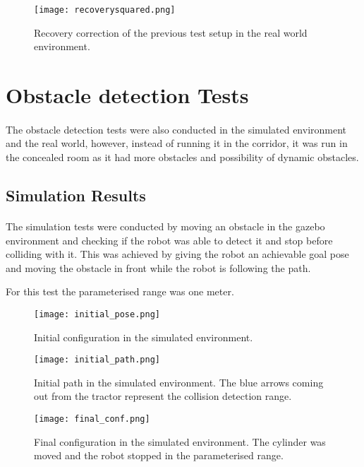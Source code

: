 \begin{figure}[h]
    \centering
    \texttt{[image: recoverysquared.png]}
    \caption{Recovery correction of the previous test setup in the real world environment.}
    \label{fig:real_recovery_test4}
\end{figure}


\clearpage
\section{Obstacle detection Tests}
\label{sec:obstacle_detection_tests}
\paragraph{}The obstacle detection tests were also conducted in the simulated environment 
and the real world, however, instead of running it in the corridor, it was run 
in the concealed room as it had more obstacles and possibility of dynamic obstacles.

\subsection{Simulation Results}
\paragraph{} The simulation tests were conducted by moving an obstacle in the 
gazebo environment and checking if the robot was able to detect it and stop 
before colliding with it. This was achieved by giving the robot an achievable 
goal pose and moving the obstacle in front while the robot is following the path.

For this test the parameterised range was one meter.

\begin{figure}[h]
    \centering
    \texttt{[image: initial\_pose.png]}
    \caption{Initial configuration in the simulated environment.}
    \label{fig:sim_obstacle_detection1}
\end{figure}
\begin{figure}[h]
    \centering
    \texttt{[image: initial\_path.png]}
    \caption{Initial path in the simulated environment. The blue arrows coming out from the tractor represent the collision detection range.}
    \label{fig:sim_obstacle_detection2}
\end{figure}

\begin{figure}[h]
    \centering
    \texttt{[image: final\_conf.png]}
    \caption{Final configuration in the simulated environment. The cylinder was moved and the robot stopped in the parameterised range.}
    \label{fig:sim_obstacle_detection3}
\end{figure}
\clearpage

